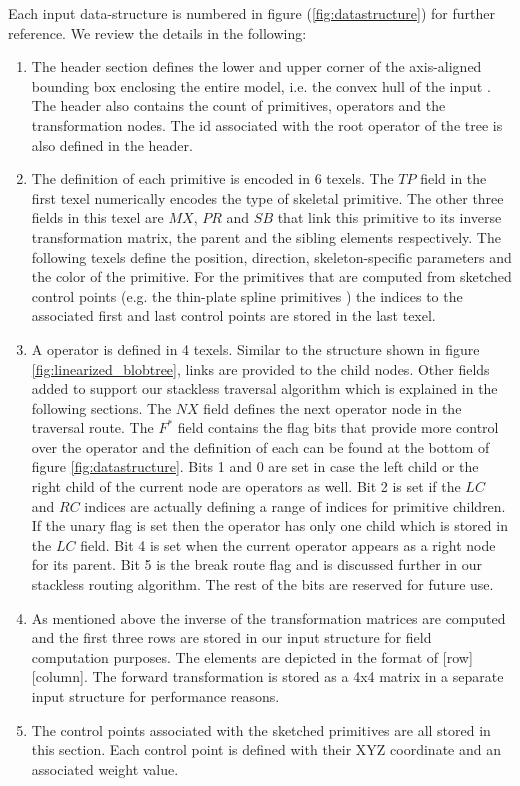 Each input data-structure is numbered in figure (\ref{fig:datastructure}) for further reference. We review the details in the following:
\begin{enumerate}
 \item The header section defines the lower and upper corner of the axis-aligned bounding box enclosing the entire model, 
 i.e. the convex hull of the input \blob. The header also contains the count of primitives, operators and the transformation 
 nodes. The id associated with the root operator of the tree is also defined in the header.
 
 \item The definition of each primitive is encoded in 6 texels. The $TP$ field in the first texel numerically encodes the 
 type of skeletal primitive. The other three fields in this texel are $MX$, $PR$ and $SB$ that link this primitive to its inverse 
 transformation matrix, the parent and the sibling elements respectively. The following texels define the position, 
 direction, skeleton-specific parameters and the color of the primitive. For the primitives that are 
 computed from sketched control points (e.g. the thin-plate spline primitives \cite{Turk1999, Grasberger}) the indices to the 
 associated first and last control points are stored in the last texel.

 \item A \blob operator is defined in 4 texels. Similar to the structure shown 
 in figure \ref{fig:linearized_blobtree}, links are provided to the child nodes.  
 Other fields added to support our stackless \blob traversal algorithm which is explained in the following 
 sections. The $NX$ field defines the next operator node in the \blob traversal route. 
 The $F^*$ field contains the flag bits that provide more control over the operator and the definition of 
 each can be found at the bottom of figure \ref{fig:datastructure}. Bits 1 and 0 are set in case the left child 
 or the right child of the current node are operators as well. Bit 2 is 
 set if the $LC$ and $RC$ indices are actually defining a range of indices for primitive children. If the unary 
 flag is set then the operator has only one child which is stored in the $LC$ field.  
 Bit 4 is set when the current operator appears as a right node for its parent. Bit 5 is the break route flag and is discussed further 
 in our stackless \blob routing algorithm. The rest of the bits are reserved for future use. 
 
 
 \item As mentioned above the inverse of the transformation matrices are computed and the first three rows are stored in our input 
 structure for field computation purposes. The elements are depicted in the format of [row][column]. The forward transformation is 
 stored as a 4x4 matrix in a separate input structure for performance reasons. 
 
 \item The control points associated with the sketched primitives are all stored in this section. Each control point is defined with 
 their XYZ coordinate and an associated weight value. 
\end{enumerate}

